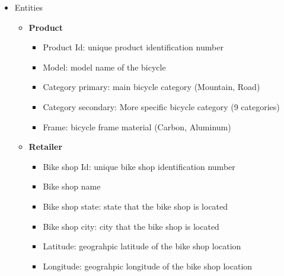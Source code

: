 \documentclass[
  ignorenonframetext,
]{beamer}
\providecommand{\tightlist}{%
  \setlength{\itemsep}{0pt}\setlength{\parskip}{0pt}}\usepackage{longtable,booktabs,array}
\begin{document}
\begin{frame}{}
\label{section-6}
\begin{itemize}
\item
  Entities

  \begin{itemize}
  \item
    \textbf{Product}

    \begin{itemize}
    \tightlist
    \item
      Product Id: unique product identification number
    \item
      Model: model name of the bicycle
    \item
      Category primary: main bicycle category (Mountain, Road)
    \item
      Category secondary: More specific bicycle category (9 categories)
    \item
      Frame: bicycle frame material (Carbon, Aluminum)
    \end{itemize}
  \item
    \textbf{Retailer}

    \begin{itemize}
    \tightlist
    \item
      Bike shop Id: unique bike shop identification number
    \item
      Bike shop name
    \item
      Bike shop state: state that the bike shop is located
    \item
      Bike shop city: city that the bike shop is located
    \item
      Latitude: geograhpic latitude of the bike shop location
    \item
      Longitude: geograhpic longitude of the bike shop location
    \end{itemize}
  \end{itemize}
\end{itemize}
\end{frame}
\end{document}
